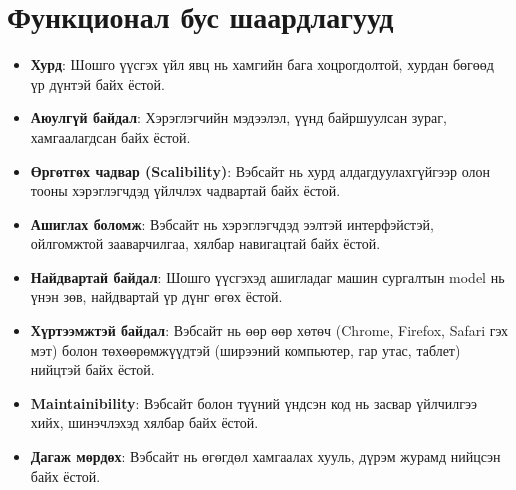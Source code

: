 \section{Функционал бус шаардлагууд}
\begin{itemize}
	\item \textbf{Хурд}: Шошго үүсгэх үйл явц нь хамгийн бага хоцрогдолтой, хурдан бөгөөд үр дүнтэй байх ёстой.

	\item \textbf{Аюулгүй байдал}: Хэрэглэгчийн мэдээлэл, үүнд байршуулсан зураг, хамгаалагдсан байх ёстой.

	\item \textbf{Өргөтгөх чадвар (Scalibility)}: Вэбсайт нь хурд алдагдуулахгүйгээр олон тооны хэрэглэгчдэд үйлчлэх чадвартай байх ёстой.

	\item \textbf{Ашиглах боломж}: Вэбсайт нь хэрэглэгчдэд ээлтэй интерфэйстэй, ойлгомжтой зааварчилгаа, хялбар навигацтай байх ёстой.

	\item \textbf{Найдвартай байдал}: Шошго үүсгэхэд ашигладаг машин сургалтын model нь үнэн зөв, найдвартай үр дүнг өгөх ёстой.

	\item \textbf{Хүртээмжтэй байдал}: Вэбсайт нь өөр өөр хөтөч (Chrome, Firefox, Safari гэх мэт) болон төхөөрөмжүүдтэй (ширээний компьютер, гар утас, таблет) нийцтэй байх ёстой.

	\item \textbf{Maintainibility}: Вэбсайт болон түүний үндсэн код нь засвар үйлчилгээ хийх, шинэчлэхэд хялбар байх ёстой.

	\item \textbf{Дагаж мөрдөх}: Вэбсайт нь өгөгдөл хамгаалах хууль, дүрэм журамд нийцсэн байх ёстой.
\end{itemize}

